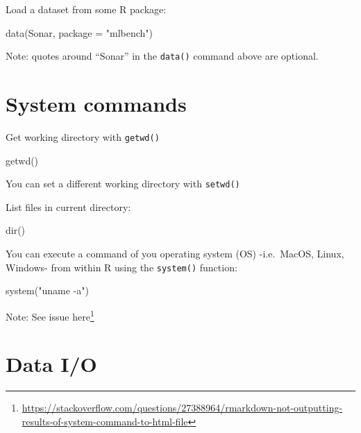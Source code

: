 \documentclass[
]{book}
\newenvironment{Shaded}{\begin{snugshade}}{\end{snugshade}}
\newcommand{\AttributeTok}[1]{\textcolor[rgb]{0.77,0.63,0.00}{#1}}
\newcommand{\FunctionTok}[1]{\textcolor[rgb]{0.00,0.00,0.00}{#1}}
\newcommand{\NormalTok}[1]{#1}
\newcommand{\StringTok}[1]{\textcolor[rgb]{0.31,0.60,0.02}{#1}}
\DeclareRobustCommand{\href}[2]{#2\footnote{\url{#1}}}
\begin{document}
Load a dataset from some R package:

\begin{Shaded}
\begin{Highlighting}[]
\FunctionTok{data}\NormalTok{(Sonar, }\AttributeTok{package =} \StringTok{"mlbench"}\NormalTok{)}
\end{Highlighting}
\end{Shaded}

Note: quotes around ``Sonar'' in the \texttt{data()} command above are optional.

\hypertarget{system-commands}{%
\section{System commands}\label{system-commands}}

Get working directory with \texttt{getwd()}

\begin{Shaded}
\begin{Highlighting}[]
\FunctionTok{getwd}\NormalTok{()}
\end{Highlighting}
\end{Shaded}

You can set a different working directory with \texttt{setwd()}

List files in current directory:

\begin{Shaded}
\begin{Highlighting}[]
\FunctionTok{dir}\NormalTok{()}
\end{Highlighting}
\end{Shaded}

You can execute a command of you operating system (OS) -i.e.~MacOS, Linux, Windows- from within R using the \texttt{system()} function:

\begin{Shaded}
\begin{Highlighting}[]
\FunctionTok{system}\NormalTok{(}\StringTok{"uname {-}a"}\NormalTok{)}
\end{Highlighting}
\end{Shaded}

Note: See issue \href{https://stackoverflow.com/questions/27388964/rmarkdown-not-outputting-results-of-system-command-to-html-file}{here}

\hypertarget{data-io}{%
\section{Data I/O}\label{data-io}}
\end{document}
